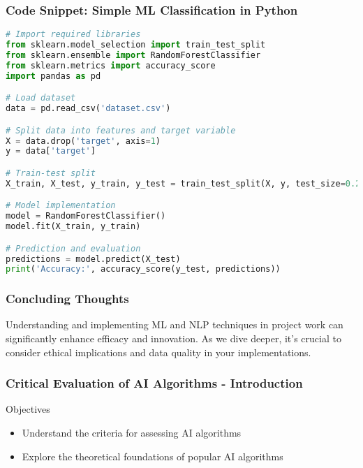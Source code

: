 \documentclass[aspectratio=169]{beamer}
\begin{document}
\begin{frame}[fragile]
    \frametitle{Code Snippet: Simple ML Classification in Python}
    \begin{lstlisting}[language=Python]
# Import required libraries
from sklearn.model_selection import train_test_split
from sklearn.ensemble import RandomForestClassifier
from sklearn.metrics import accuracy_score
import pandas as pd

# Load dataset
data = pd.read_csv('dataset.csv')

# Split data into features and target variable
X = data.drop('target', axis=1)
y = data['target']

# Train-test split
X_train, X_test, y_train, y_test = train_test_split(X, y, test_size=0.2, random_state=42)

# Model implementation
model = RandomForestClassifier()
model.fit(X_train, y_train)

# Prediction and evaluation
predictions = model.predict(X_test)
print('Accuracy:', accuracy_score(y_test, predictions))
    \end{lstlisting}
\end{frame}

\begin{frame}
    \frametitle{Concluding Thoughts}
    Understanding and implementing ML and NLP techniques in project work can significantly enhance efficacy and innovation. As we dive deeper, it’s crucial to consider ethical implications and data quality in your implementations.
\end{frame}

\begin{frame}[fragile]
    \frametitle{Critical Evaluation of AI Algorithms - Introduction}
    \begin{block}{Objectives}
        \begin{itemize}
            \item Understand the criteria for assessing AI algorithms
            \item Explore the theoretical foundations of popular AI algorithms
        \end{itemize}
    \end{block}
\end{frame}
\end{document}
